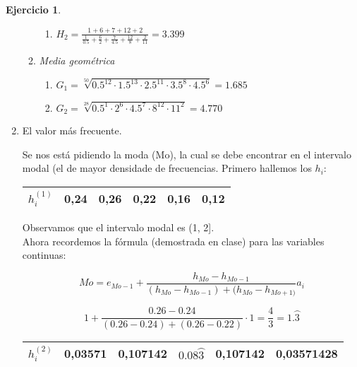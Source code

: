 \documentclass[a4paper, 12pt]{article}
\theoremstyle{definition}
\newtheorem{ej}{Ejercicio}
\begin{document}
\begin{ej}
\begin{enumerate}[label=\textit{\alph*)}]
\begin{enumerate}[label=]
\begin{enumerate}[label=\arabic*.]
            \item \(H_2 = \frac{1+6+7+12+2}{\frac{1}{0.5} + \frac{6}{2} + \frac{7}{4.5} + \frac{12}{8} + \frac{2}{11}} = 3.399\)
        \end{enumerate}
        
        \item \textit{Media geométrica}
        \begin{enumerate}[label=\arabic*.]
            \item \(G_1 = \sqrt[50]{0.5^{12} \cdot 1.5^{13} \cdot 2.5^{11} \cdot 3.5^8 \cdot 4.5^6} = 1.685\)
            
            \item \(G_2 = \sqrt[28]{0.5^1 \cdot 2^6 \cdot 4.5^7 \cdot 8^{12} \cdot 11^2} = 4.770\)
        \end{enumerate}
    \end{enumerate}
    
    \item El valor más frecuente.
    
    Se nos está pidiendo la moda (Mo), la cual se debe encontrar en el intervalo modal (el de mayor densidade de frecuencias. Primero hallemos los \(h_i\):
    \begin{center}
        \begin{tabular}{|c|c|c|c|c|c|}
        \hline
             \(h_i^{(1)}\) & 0,24 & 0,26 & 0,22 & 0,16 & 0,12 \\
        \hline
        \end{tabular}
    \end{center}
    
    Observamos que el intervalo modal es (1, 2]. \\
    Ahora recordemos la fórmula (demostrada en clase) para las variables continuas:
    
    \begin{equation}\label{eqn:moda_continua}
        Mo = e_{Mo-1} + \frac{h_{Mo} - h_{Mo-1}}{(h_{Mo} - h_{Mo-1}) + (h_{Mo} - h_{Mo+1)}}a_i
    \end{equation}
    
    \[
    1 + \frac{0.26 - 0.24}{(0.26-0.24) + (0.26 - 0.22)} \cdot 1 = \frac{4}{3} = 1.\wideparen{3}
    \]
    
    \begin{center}
        \begin{tabular}{|c|c|c|c|c|c|}
        \hline
             \(h_i^{(2)}\) & 0,03571 & 0,107142 & \(0.08\wideparen{3}\) & 0,107142 & 0,03571428 \\
        \hline
        \end{tabular}
    \end{center}
    

\end{enumerate}
\end{ej}
\end{document}
